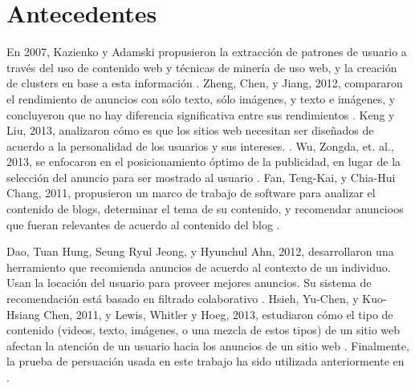 
\chapter{Antecedentes}

En 2007, Kazienko y Adamski propusieron la extracción de patrones de usuario a través del uso de contenido web y técnicas de minería de uso web, y la creación de clusters en base a esta información \cite{kazienko2007adrosa}. Zheng, Chen, y Jiang, 2012, compararon el rendimiento de anuncios con sólo texto, sólo imágenes, y texto e imágenes, y concluyeron que no hay diferencia significativa entre sus rendimientos \cite{zheng2012ontology}. Keng y Liu, 2013, analizaron cómo es que los sitios web necesitan ser diseñados de acuerdo a la personalidad de los usuarios y sus intereses. \cite{keng2013can}. Wu, Zongda, et. al., 2013, se enfocaron en el posicionamiento óptimo de la publicidad, en lugar de la selección del anuncio para ser mostrado al usuario \cite{wu2013position}. Fan, Teng-Kai, y Chia-Hui Chang, 2011, propusieron un marco de trabajo de software para analizar el contenido de blogs, determinar el tema de su contenido, y recomendar anuncioos que fueran relevantes de acuerdo al contenido del blog \cite{fan2011blogger}. 

Dao, Tuan Hung, Seung Ryul Jeong, y Hyunchul Ahn, 2012, desarrollaron una herramiento que recomienda anuncios de acuerdo al contexto de un individuo. Usan la locación del usuario para proveer mejores anuncios. Su sistema de recomendación está basado en filtrado colaborativo \cite{dao2012novel}. Hsieh, Yu-Chen, y Kuo-Hsiang Chen, 2011, y Lewis, Whitler y Hoeg, 2013, estudiaron cómo el tipo de contenido (videos, texto, imágenes, o una mezcla de estos tipos) de un sitio web afectan la atención de un usuario hacia los anuncios de un sitio web \cite{hsieh2011different} \cite{lewis2013customer}. Finalmente, la prueba de persuación usada en este trabajo ha sido utilizada anteriormente en \cite{madera2014ad}.




